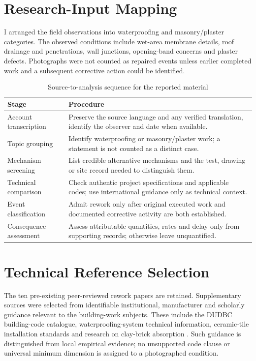 \section{Research-Input Mapping}
I arranged the field observations into waterproofing and masonry/plaster categories. The observed conditions include wet-area membrane details, roof drainage and penetrations, wall junctions, opening-band concerns and plaster defects. Photographs were not counted as repaired events unless earlier completed work and a subsequent corrective action could be identified.

\begin{table}[htbp]
\caption{Source-to-analysis sequence for the reported material}
\label{tab:sourceflow}
\centering
\begin{tabularx}{\textwidth}{@{}L{3.1cm}X@{}}
\toprule Stage & Procedure \\ \midrule
Account transcription & Preserve the source language and any verified translation, identify the observer and date when available.\\
Topic grouping & Identify waterproofing or masonry/plaster work; a statement is not counted as a distinct case.\\
Mechanism screening & List credible alternative mechanisms and the test, drawing or site record needed to distinguish them.\\
Technical comparison & Check authentic project specifications and applicable codes; use international guidance only as technical context.\\
Event classification & Admit rework only after original executed work and documented corrective activity are both established.\\
Consequence assessment & Assess attributable quantities, rates and delay only from supporting records; otherwise leave unquantified.\\ \bottomrule
\end{tabularx}
\end{table}

\section{Technical Reference Selection}
The ten pre-existing peer-reviewed rework papers are retained. Supplementary sources were selected from identifiable institutional, manufacturer and scholarly guidance relevant to the building-work subjects. These include the DUDBC building-code catalogue, waterproofing-system technical information, ceramic-tile installation standards and research on clay-brick absorption \parencite{dudbc2024,tcna2023,bailey1990}. Such guidance is distinguished from local empirical evidence; no unsupported code clause or universal minimum dimension is assigned to a photographed condition.

